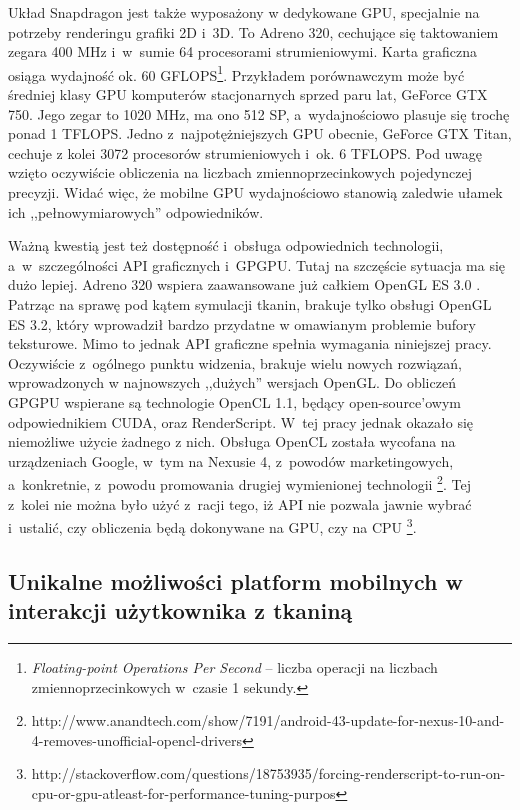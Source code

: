 		Układ Snapdragon jest także wyposażony w dedykowane GPU, specjalnie na potrzeby renderingu grafiki 2D i~3D. To Adreno 320, cechujące się taktowaniem zegara 400 MHz i~w~sumie 64 procesorami strumieniowymi. Karta graficzna osiąga wydajność ok. 60 GFLOPS\footnote{\emph{Floating-point Operations Per Second} -- liczba operacji na liczbach zmiennoprzecinkowych w~czasie 1 sekundy.}. Przykładem porównawczym może być średniej klasy GPU komputerów stacjonarnych sprzed paru lat, GeForce GTX 750. Jego zegar to 1020 MHz, ma ono 512 SP, a~wydajnościowo plasuje się trochę ponad 1 TFLOPS. Jedno z~najpotężniejszych GPU obecnie, GeForce GTX Titan, cechuje z kolei 3072 procesorów strumieniowych i~ok. 6 TFLOPS. Pod uwagę wzięto oczywiście obliczenia na liczbach zmiennoprzecinkowych pojedynczej precyzji. Widać więc, że mobilne GPU wydajnościowo stanowią zaledwie ułamek ich ,,pełnowymiarowych'' odpowiedników.
		
		Ważną kwestią jest też dostępność i~obsługa odpowiednich technologii, a~w~szczególności API graficznych i~GPGPU. Tutaj na szczęście sytuacja ma się dużo lepiej. Adreno 320 wspiera zaawansowane już całkiem OpenGL ES 3.0 \cite{specs_adreno}. Patrząc na sprawę pod kątem symulacji tkanin, brakuje tylko obsługi OpenGL ES 3.2, który wprowadził bardzo przydatne w omawianym problemie bufory teksturowe. Mimo to jednak API graficzne spełnia wymagania niniejszej pracy. Oczywiście z~ogólnego punktu widzenia, brakuje wielu nowych rozwiązań, wprowadzonych w najnowszych ,,dużych'' wersjach OpenGL. Do obliczeń GPGPU wspierane są technologie OpenCL 1.1, będący open-source'owym odpowiednikiem CUDA, oraz RenderScript. W~tej pracy jednak okazało się niemożliwe użycie żadnego z nich. Obsługa OpenCL została wycofana na urządzeniach Google, w~tym na Nexusie 4, z~powodów marketingowych, a~konkretnie, z~powodu promowania drugiej wymienionej technologii \footnote{http://www.anandtech.com/show/7191/android-43-update-for-nexus-10-and-4-removes-unofficial\allowbreak-opencl-drivers}. Tej z~kolei nie można było użyć z~racji tego, iż API nie pozwala jawnie wybrać i~ustalić, czy obliczenia będą dokonywane na GPU, czy na CPU \footnote{http://stackoverflow.com/questions/18753935/forcing-renderscript-to-run-on-cpu-or-gpu-atleast\allowbreak-for-performance-tuning-purpos}.
		
		\subsection{Unikalne możliwości platform mobilnych w interakcji użytkownika z tkaniną}
		\label{t:technologie:mobilne:interakcja}
		
